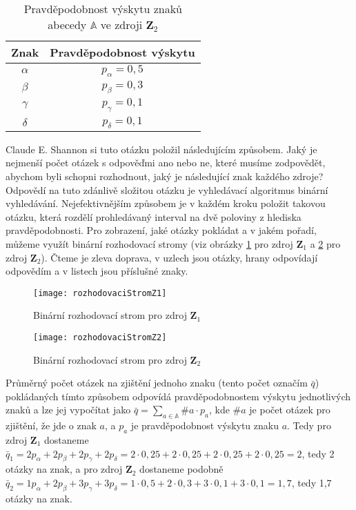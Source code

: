 \begin{table}[!htb]
\centering
\begin{tabular}{|c|c|}
\hline
Znak & Pravděpodobnost výskytu\\
\hline
$\alpha$ & $p_\alpha = 0,5$\\
$\beta$ & $p_\beta = 0,3$\\
$\gamma$ & $p_\gamma = 0,1$\\
$\delta$ & $p_\delta = 0,1$\\
\hline
\end{tabular}
\caption{Pravděpodobnost výskytu znaků abecedy $\mathbb{A}$ ve zdroji $\mathbf{Z}_2$}
\label{pstVyskytu}
\end{table}

Claude E. Shannon si tuto otázku položil následujícím způsobem. Jaký je nejmenší počet otázek s odpověďmi ano nebo ne, které musíme zodpovědět, abychom byli schopni rozhodnout, jaký je následující znak každého zdroje? Odpovědí na tuto zdánlivě složitou otázku je vyhledávací algoritmus binární vyhledávání. Nejefektivnějším způsobem je v každém kroku položit takovou otázku, která rozdělí prohledávaný interval na dvě poloviny z hlediska pravděpodobnosti. Pro zobrazení, jaké otázky pokládat a v jakém pořadí, můžeme využít binární rozhodovací stromy (viz obrázky \ref{rozhodovaciStromZ1} pro zdroj $\mathbf{Z}_1$ a \ref{rozhodovaciStromZ2} pro zdroj $\mathbf{Z}_2$). Čteme je zleva doprava, v uzlech jsou otázky, hrany odpovídají odpovědím a v listech jsou příslušné znaky.

\begin{figure}[!htb]
\centering
\texttt{[image: rozhodovaciStromZ1]}
\caption{Binární rozhodovací strom pro zdroj $\mathbf{Z}_1$}
\label{rozhodovaciStromZ1}
\end{figure}

\begin{figure}[!htb]
\centering
\texttt{[image: rozhodovaciStromZ2]}
\caption{Binární rozhodovací strom pro zdroj $\mathbf{Z}_2$}
\label{rozhodovaciStromZ2}
\end{figure}

Průměrný počet otázek na zjištění jednoho znaku (tento počet označím $\bar{q}$) pokládaných tímto způsobem odpovídá pravděpodobnostem výskytu jednotlivých znaků a lze jej vy\-po\-čí\-tat jako $\bar{q} = \sum_{a \in \mathbb{A}} \#a \cdot p_a$, kde $\#a$ je počet otázek pro zjištění, že jde o znak $a$, a $p_a$ je pravděpodobnost výskytu znaku $a$. Tedy pro zdroj $\mathbf{Z}_1$ dostaneme $\bar{q}_1 = 2p_\alpha + 2p_\beta + 2p_\gamma + 2p_\delta =2\cdot0,25 + 2\cdot0,25 + 2\cdot0,25 + 2\cdot0,25 = 2$, tedy 2 otázky na znak, a pro zdroj $\mathbf{Z}_2$ dostaneme podobně $\bar{q}_2 = 1p_\alpha + 2p_\beta + 3p_\gamma + 3p_\delta =1\cdot0,5 + 2\cdot0,3 + 3\cdot0,1 + 3\cdot0,1 = 1,7$, tedy 1,7 otázky na znak.

